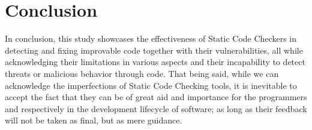 
\chapter{Conclusion}\label{cap:conclusion}

In conclusion, this study showcases the effectiveness of Static Code Checkers in detecting and fixing improvable code together with their vulnerabilities, all while acknowledging their limitations in various aspects and their incapability to detect threats or malicious behavior through code. That being said, while we can acknowledge the imperfections of Static Code Checking tools, it is inevitable to accept the fact that they can be of great aid and importance for the programmers and respectively in the development lifecycle of software; as long as their feedback will not be taken as final, but as mere guidance. 